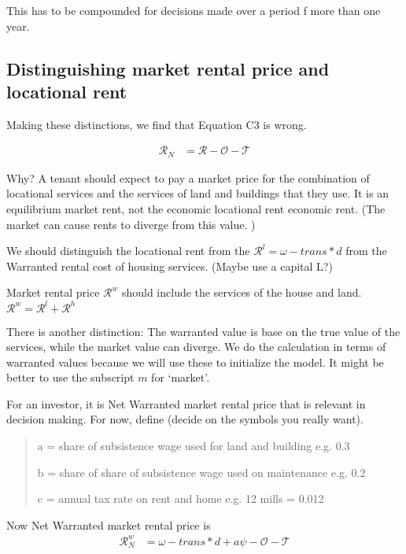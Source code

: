 This has to be compounded for decisions made over a period f more than one year.


\subsection{Distinguishing market rental price and locational rent}



Making these distinctions, we find that Equation C3 is wrong.

\begin{align}
\mathcal{R}_N &= \mathcal{R} - \mathcal{O} - \mathcal{T}
\end{align}

Why?  A tenant should expect to pay a market price for the combination of locational services and the services of land and buildings that they use.  It is an equilibrium market rent, not the economic locational rent economic rent. (The market can cause rents to diverge from this value. ) 

We should distinguish the locational rent from the $\mathcal{R}^l = \omega - trans*d$ from the Warranted rental cost of housing services. (Maybe use a capital L?) 

Market  rental price $\mathcal{R}^w$ should  include the services of the house and land.  $\mathcal{R}^w =\mathcal{R}^l+\mathcal{R}^h$ 

There is another distinction: The warranted value is base on the true value of the services, while the market value can diverge. We do the calculation in terms of warranted values because we will use these to initialize the model. It might be better to use the subscript $m$ for `market'. 

For an investor, it is Net Warranted market  rental price that is relevant in decision making. For now, define (decide on the symbols you really want).
\begin{quotation}
a  =  share of subsistence wage  used for land and building e.g. 0.3

b  = share of share of subsistence wage  used on maintenance e.g. 0.2

c  = annual tax rate on rent and home  e.g. 12 mills = 0.012

\end{quotation}
Now Net Warranted market  rental price is
\begin{align}
\mathcal{R}_N^w &= \omega - trans*d + a\psi -  \mathcal{O} - \mathcal{T} \\
\end{align}

